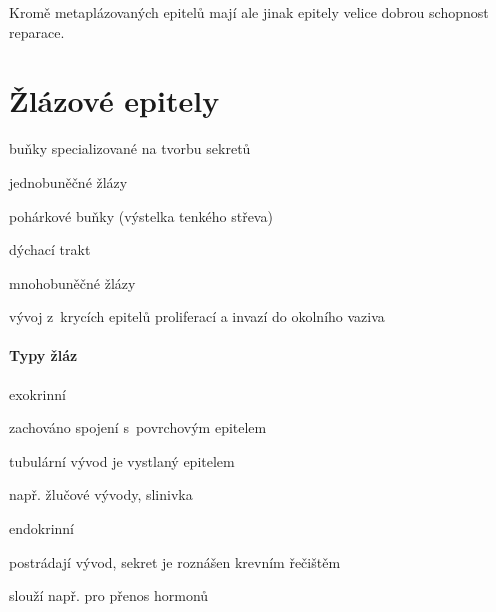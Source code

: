 \documentclass[DIV=8]{scrreprt}
\begin{document}
Kromě metaplázovaných epitelů mají ale jinak epitely velice dobrou schopnost reparace.

\section{Žlázové epitely} \label{Žlázové epitely} \FloatBarrier


\begin{myItemize}[nosep]
    \item buňky specializované na tvorbu sekretů
    \item jednobuněčné žlázy
\begin{myItemize}[nosep]
    \item pohárkové buňky (výstelka tenkého střeva)
    \item dýchací trakt
\end{myItemize}

    \item mnohobuněčné žlázy
\begin{myItemize}[nosep]
    \item vývoj z krycích epitelů proliferací a invazí do okolního vaziva
\end{myItemize}

\end{myItemize}



\paragraph{Typy žláz}
\begin{myItemize}[nosep]
    \item exokrinní
\begin{myItemize}[nosep]
    \item zachováno spojení s povrchovým epitelem
    \item tubulární vývod je vystlaný epitelem
    \item např. žlučové vývody, slinivka
\end{myItemize}

    \item endokrinní
\begin{myItemize}[nosep]
    \item postrádají vývod, sekret je roznášen krevním řečištěm
    \item slouží např. pro přenos hormonů
\end{myItemize}

\end{myItemize}
\end{document}
